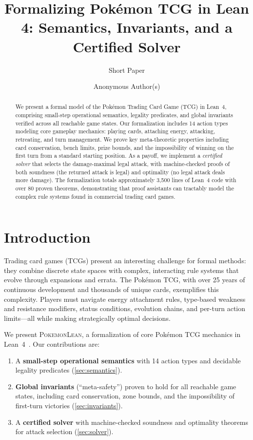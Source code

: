 \documentclass[a4paper,UKenglish,cleveref,autoref,anonymous]{lipics-v2021}
\title{Formalizing Pok\'emon TCG in Lean 4: Semantics, Invariants, and a Certified Solver}
\subtitle{Short Paper}
\author{Anonymous Author(s)}{Anonymous Institution, Country}{anonymous@example.org}{}{}
\begin{document}
\maketitle

\begin{abstract}
We present a formal model of the Pok\'emon Trading Card Game (TCG) in Lean~4, comprising small-step operational semantics, legality predicates, and global invariants verified across all reachable game states.
Our formalization includes 14 action types modeling core gameplay mechanics: playing cards, attaching energy, attacking, retreating, and turn management.
We prove key meta-theoretic properties including card conservation, bench limits, prize bounds, and the impossibility of winning on the first turn from a standard starting position.
As a payoff, we implement a \emph{certified solver} that selects the damage-maximal legal attack, with machine-checked proofs of both soundness (the returned attack is legal) and optimality (no legal attack deals more damage).
The formalization totals approximately 3{,}500 lines of Lean~4 code with over 80 proven theorems, demonstrating that proof assistants can tractably model the complex rule systems found in commercial trading card games.
\end{abstract}

\section{Introduction}
\label{sec:intro}

Trading card games (TCGs) present an interesting challenge for formal methods: they combine discrete state spaces with complex, interacting rule systems that evolve through expansions and errata.
The Pok\'emon TCG, with over 25 years of continuous development and thousands of unique cards, exemplifies this complexity.
Players must navigate energy attachment rules, type-based weakness and resistance modifiers, status conditions, evolution chains, and per-turn action limits---all while making strategically optimal decisions.

We present \textsc{PokemonLean}, a formalization of core Pok\'emon TCG mechanics in Lean~4~\cite{lean4,DBLP:conf/cav/MouraKADR15}.
Our contributions are:
\begin{enumerate}
\item A \textbf{small-step operational semantics} with 14 action types and decidable legality predicates (\cref{sec:semantics}).
\item \textbf{Global invariants} (``meta-safety'') proven to hold for all reachable game states, including card conservation, zone bounds, and the impossibility of first-turn victories (\cref{sec:invariants}).
\item A \textbf{certified solver} with machine-checked soundness and optimality theorems for attack selection (\cref{sec:solver}).
\end{enumerate}
\end{document}
